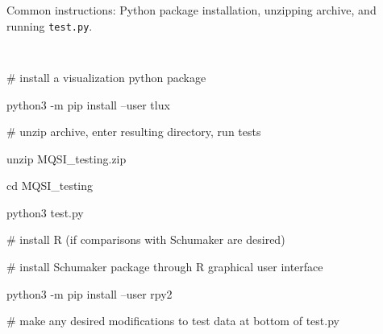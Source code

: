 \vskip 5mm

Common instructions: Python package installation, unzipping archive, and running {\hskip 1mm} {\tt test.py}.

{\parskip=2pt \parindent=20pt \tt
\item{} \textMaroon \# install a visualization python package \textBlack
\item{} python3 -m pip install --user tlux
\item{}
\item{} \textMaroon \# unzip archive, enter resulting directory, run tests \textBlack
\item{} unzip MQSI\_testing.zip
\item{} cd MQSI\_testing
\item{} python3 test.py
\item{}
\item{} \textMaroon \# install R (if comparisons with Schumaker are desired) \textBlack
\item{} \textMaroon \# install Schumaker package through R graphical user interface \textBlack
\item{} python3 -m pip install --user rpy2
\item{}
\item{} \textMaroon \# make any desired modifications to test data at bottom of \textBlack test.py 
}

\bye


